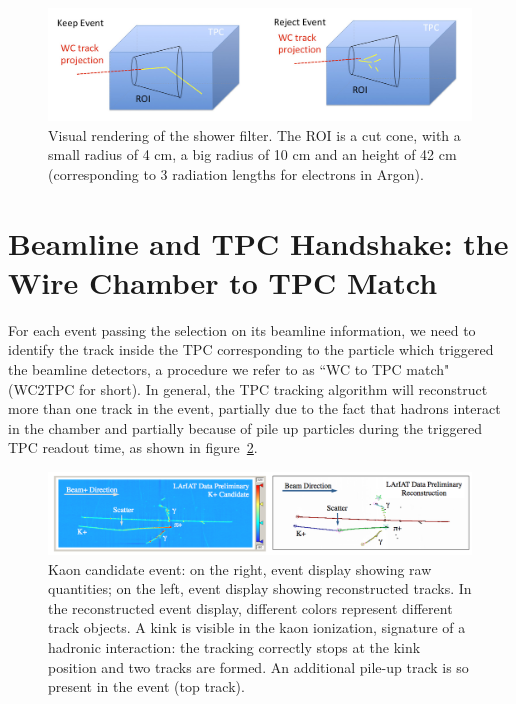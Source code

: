 \begin{figure}
  \centering  
\includegraphics[width=\textwidth]{Chapter-4/Images/Shower.png}
\caption{Visual rendering of the shower filter. The ROI is a cut cone, with a small radius of 4 cm, a big radius of 10 cm and an height of 42 cm (corresponding to 3 radiation lengths for electrons in Argon).}
\label{fig:showerFilt}
\end{figure}



\section{Beamline and TPC Handshake: the Wire Chamber to TPC Match}\label{ch:WC2TPCMatchMethod}
For each event passing the selection on its beamline information, we need to identify the track inside the TPC corresponding to the particle which triggered the beamline detectors, a procedure we refer to as ``WC to TPC match" (WC2TPC for short). In general, the TPC tracking algorithm will reconstruct more than one track in the event, partially due to the fact that hadrons interact in the chamber and partially because of pile up particles during the triggered TPC readout time, as shown in figure~\ref{fig:kaonInteraction}. 


\begin{figure}
  \centering  
\includegraphics[width=\textwidth]{Chapter-4/Images/KaonExample.png}
\caption{Kaon candidate event: on the right, event display showing raw quantities; on the left, event display showing reconstructed tracks. In the reconstructed event display, different colors represent different track objects. A kink is visible in the kaon ionization, signature of a hadronic interaction: the tracking correctly stops at the kink position and two tracks are formed. An additional pile-up track is so present in the event (top track).}
\label{fig:kaonInteraction}
\end{figure}



